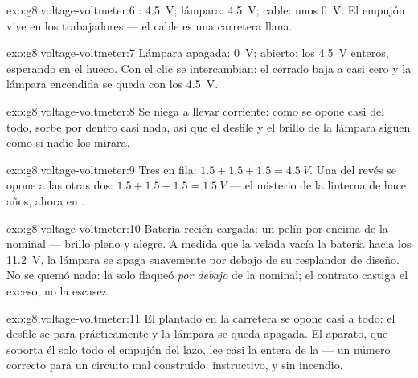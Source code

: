 \begin{solution}{exo:g8:voltage-voltmeter:6}
: \qty{4.5}{V}; lámpara: \qty{4.5}{V}; cable: unos
\qty{0}{V}. El empujón vive en los trabajadores --- el cable es una
carretera llana.
\end{solution}

\begin{solution}{exo:g8:voltage-voltmeter:7}
Lámpara apagada: \qty{0}{V};  abierto: los
\qty{4.5}{V} enteros, esperando en el hueco. Con el clic se
intercambian: el  cerrado baja a casi cero y la lámpara
encendida se queda con los \qty{4.5}{V}.
\end{solution}

\begin{solution}{exo:g8:voltage-voltmeter:8}
Se niega a llevar corriente: como se opone casi del todo, sorbe por
dentro casi nada, así que el desfile y el brillo de la lámpara siguen
como si nadie los mirara.
\end{solution}

\begin{solution}{exo:g8:voltage-voltmeter:9}
Tres  en fila: $1.5 + 1.5 + 1.5 = \qty{4.5}{V}$. Una del revés se
opone a las otras dos: $1.5 + 1.5 - 1.5 = \qty{1.5}{V}$ --- el misterio
de la linterna de hace años, ahora en .
\end{solution}

\begin{solution}{exo:g8:voltage-voltmeter:10}
Batería recién cargada: un pelín por encima de la nominal ---
brillo pleno y alegre. A medida que la velada vacía la
batería hacia los \qty{11.2}{V}, la lámpara se apaga suavemente
por debajo de su resplandor de diseño. No se quemó nada: la
 solo flaqueó \emph{por debajo} de la nominal; el contrato
castiga el exceso, no la escasez.
\end{solution}

\begin{solution}{exo:g8:voltage-voltmeter:11}
El  plantado en la carretera se opone casi a todo: el
desfile se para prácticamente y la lámpara se queda apagada. El
aparato, que soporta él solo todo el empujón del lazo, lee casi la
 entera de la  --- un número correcto para
un circuito mal construido: instructivo, y sin incendio.
\end{solution}


